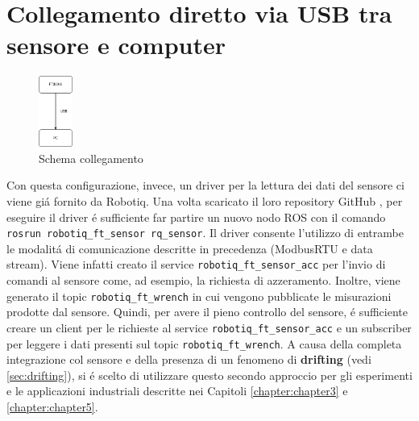\section{Collegamento diretto via USB tra sensore e computer}
\begin{figure}[H]
    \centering
    \includegraphics*[width=0.1\textwidth]{images/ft-pc.png}
    \caption{Schema collegamento}
    \label{fig:ft-pc}
\end{figure}
Con questa configurazione, invece, un driver per la lettura dei dati del sensore ci viene gi\'{a} fornito da Robotiq.
Una volta scaricato il loro repository GitHub \cite{robotiq_repo}, per eseguire il driver \'{e} sufficiente far partire 
un nuovo nodo ROS con il comando \verb|rosrun robotiq_ft_sensor rq_sensor|. 
Il driver consente l'utilizzo di entrambe le modalit\'{a} di comunicazione descritte in precedenza (ModbusRTU e data stream).
Viene infatti creato il service \verb|robotiq_ft_sensor_acc| per l'invio di comandi al sensore come, ad esempio, la richiesta 
di azzeramento. Inoltre, viene generato il topic \verb|robotiq_ft_wrench| in cui vengono pubblicate le misurazioni prodotte dal 
sensore. Quindi, per avere il pieno controllo del sensore, \'{e} sufficiente creare un client per le richieste al service 
\verb|robotiq_ft_sensor_acc| e un subscriber per leggere i dati presenti sul topic \verb|robotiq_ft_wrench|. 
A causa della completa integrazione col sensore e della presenza di un fenomeno di \textbf{drifting} (vedi \ref{sec:drifting}), 
si \'{e} scelto di utilizzare questo secondo approccio per gli esperimenti e le applicazioni industriali descritte nei 
Capitoli \ref{chapter:chapter3} e \ref{chapter:chapter5}.
